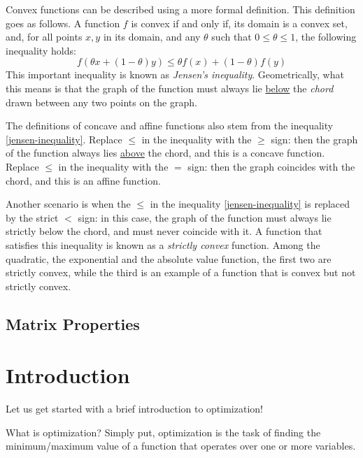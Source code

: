 \documentclass[a4paper]{article}
\theoremstyle{definition}
\begin{document}
Convex functions can be described using a more formal definition.
This definition goes as follows.
A function $f$ is convex if and only if, its domain is a convex set, and, for all points $x, y$ in its domain, and any $\theta$ such that $0 \leq \theta \leq 1$, the following inequality holds:
\begin{equation}
	\label{jensen-inequality}
	f(\theta x + (1 - \theta) y) \leq \theta f(x) + (1 - \theta) f(y)
\end{equation}
This important inequality is known as \textit{Jensen's inequality}.
Geometrically, what this means is that the graph of the function must always lie \underline{below} the \textit{chord} drawn between any two points on the graph. %

The definitions of concave and affine functions also stem from the inequality \eqref{jensen-inequality}.
Replace $\leq$ in the inequality with the $\geq$ sign: then the graph of the function always lies \underline{above} the chord, and this is a concave function.
Replace $\leq$ in the inequality with the $=$ sign: then the graph coincides with the chord, and this is an affine function.

Another scenario is when the $\leq$ in the inequality \eqref{jensen-inequality} is replaced by the strict $<$ sign: in this case, the graph of the function must always lie strictly below the chord, and must never coincide with it.
A function that satisfies this inequality is known as a \textit{strictly convex} function.
Among the quadratic, the exponential and the absolute value function, the first two are strictly convex, while the third is an example of a function that is convex but not strictly convex.

\subsection{Matrix Properties}


\section{Introduction}

Let us get started with a brief introduction to optimization!

What is optimization?
Simply put, optimization is the task of finding the minimum/maximum value of a function that operates over one or more variables.
\end{document}
